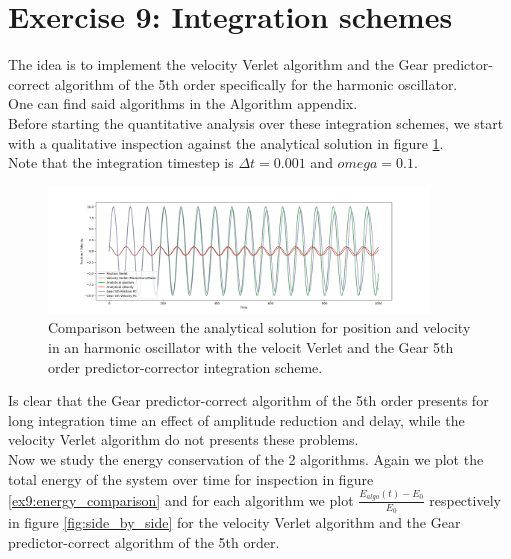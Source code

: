 \chapter*{Exercise 9: Integration schemes}

The idea is to implement the velocity Verlet algorithm and the Gear predictor-correct algorithm of the 5th order specifically for the harmonic oscillator. \\
One can find said algorithms in the Algorithm appendix. \\
Before starting the quantitative analysis over these integration schemes, we start with a qualitative inspection against the analytical solution in figure \ref{ex9:schemes_comparison}. \\
Note that the integration timestep is $\Delta t = 0.001$ and $omega = 0.1$.

\begin{figure}[H]
    \centering
    \includegraphics[width=0.9\textwidth]{FIG/ex9/integration_schemes_comparison.png}
    \caption{Comparison between the analytical solution for position and velocity in an harmonic oscillator with the velocit Verlet and the Gear 5th order predictor-corrector integration scheme.}
    \label{ex9:schemes_comparison}
\end{figure}

Is clear that the Gear predictor-correct algorithm of the 5th order presents for long integration time an effect of amplitude reduction and delay, while the velocity Verlet algorithm do not presents these problems. \\
Now we study the energy conservation of the 2 algorithms. Again we plot the total energy of the system over time for inspection in figure \ref{ex9:energy_comparison} and for each algorithm we plot $\frac{E_{algo}(t) - E_0}{E_0}$ respectively in figure \ref{fig:side_by_side} for the velocity Verlet algorithm and the Gear predictor-correct algorithm of the 5th order. 


